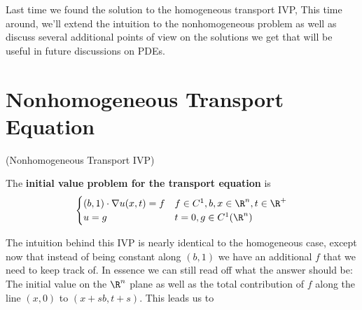 \documentclass{bkcnotes}
\begin{document}
\maketitle

Last time we found the solution to the homogeneous transport IVP, This
time around, we'll extend the intuition to the nonhomogeneous problem
as well as discuss several additional points of view on the solutions
we get that will be useful in future discussions on PDEs.

\section{Nonhomogeneous Transport Equation}

\begin{ndefn}(Nonhomogeneous Transport IVP)

  The \textbf{initial value problem for the transport equation} is
  \begin{equation}
    \label{eq:ntransport-ivp}
    \begin{cases}
      (b,1) \cdot \nabla u(x,t) = f & f \in C^1, b,x \in \R^n, t \in \R^+ \\
      u = g & t = 0, g \in C^1(\R^n)
    \end{cases}
  \end{equation}
\end{ndefn}
The intuition behind this IVP is nearly identical to
the homogeneous case, except now that instead of being constant
along $(b,1)$ we have an additional $f$ that we need to keep track
of. In essence we can still read off what the answer should be: The
initial value on the $\R^n$ plane as well as the total contribution of
$f$ along the line $(x,0)$ to $(x+sb,t+s)$. This leads us to
\end{document}
